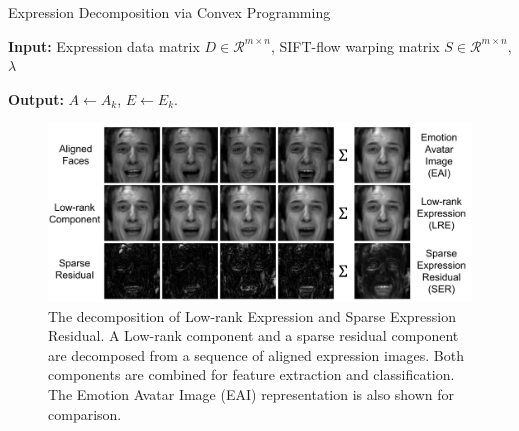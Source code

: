 \documentclass[journal]{IEEEtran}
\begin{document}
\begin{algorithm}[htb]
    \caption{Expression Decomposition via Convex Programming}
    \textbf{Input:} Expression data matrix $D\in \mathscr{R}^{m\times n}$, SIFT-flow warping matrix $S\in \mathscr{R}^{m\times n}$, $\lambda$ \\
    \begin{algorithmic}[1]
				
				
				
			\EndWhile
    \end{algorithmic}
    \textbf{Output:} $A\leftarrow A_k$, $E\leftarrow E_k$. \\
    \label{alg}
\end{algorithm}

\begin{figure}[htbp]
	\centering
		\includegraphics[width=\columnwidth]{pics/low_rank_sparse}
	\caption{The decomposition of Low-rank Expression and Sparse Expression Residual. A Low-rank component and a sparse residual component are decomposed from a sequence of aligned expression images. Both components are combined for feature extraction and classification. The Emotion Avatar Image (EAI) representation is also shown for comparison.}
	\label{fig:low_rank_sparse}
\end{figure}
\end{document}

